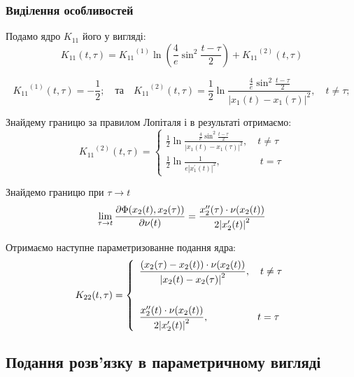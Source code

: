 \documentclass{beamer}
\numberwithin{equation}{section}
\begin{document}
	\begin{frame}
		\frametitle{Виділення особливостей}
		 Подамо ядро $K_{11}$ його у вигляді:
		$$
		\displaystyle
		K_{11}(t, \tau) = {K_{11}}^{(1)} \ln \left(\frac{4}{e} \sin ^{2}  \frac{t-\tau}{2}\right)+{K_{11}}^{(2)}(t, \tau)
		$$
		
		$$
		\displaystyle
		{K_{11}}^{(1)}(t, \tau) =-\frac{1}{2};
		\displaystyle
		\quad \text{та} \quad
		\displaystyle
		{K_{11}}^{(2)}(t, \tau) =\frac{1}{2} \ln{\frac{\frac{4}{e} \sin ^{2} \frac{t-\tau}{2}}{\left|x_{1}(t)-x_{1}(\tau)\right|^{2}}}, \quad t \neq \tau;
		$$
		
		 Знайдему границю за правилом Лопіталя і в результаті отримаємо:
		$$
		{K_{11}}^{(2)}(t, \tau) =
		\left\{
		\begin{array}{l}
			\displaystyle
			\frac{1}{2} \ln{\frac{\frac{4}{e} \sin ^{2} \frac{t-\tau}{2}}{\left|x_{1}(t)-x_{1}(\tau)\right|^{2}}}
			,\quad t \neq \tau
			\\ [1cm]
			
			\displaystyle
			\frac{1}{2} \ln \frac{1}{e\left|x_{1}^{\prime}(t)\right|^{2}}
			,\quad  \quad  \quad  \quad   t = \tau
		\end{array}
		\right.
		$$
		
	\end{frame}

	
	\begin{frame}
	    Знайдемо границю при $\tau \rightarrow t$
		$$
		\lim_{\tau \rightarrow t } \pdv{\Phi(x_{2}(t), x_{2}(\tau))}{\nu(t)} =
		\frac{  x''_{2}(\tau) \cdot \nu (x_2(t)) }{ 2\abs{ x'_{2}(t)}^2 } 
		$$
		
		Отримаємо наступне параметризованне подання ядра:
		$$
		K_{22}(t, \tau) = 
		\left\{
		\begin{array}{l}
			\displaystyle
			\frac{ \left( x_{2}(\tau) - x_{2}(t) \right) \cdot \nu (x_2(t)) }{ \abs{ x_{2}(t)-x_{2}(\tau) }^2 } 
			,\quad t \neq \tau
			\\ [1cm]
			
			\displaystyle
			\frac{  x''_{2}(t) \cdot \nu (x_2(t)) }{ 2\abs{ x'_{2}(t)}^2 } 
			,\quad \quad  \quad  \quad  \quad  t = \tau
		\end{array}
		\right.
		$$
	\end{frame}


	\subsection{Подання розв'язку в параметричному вигляді} 
\end{document}

